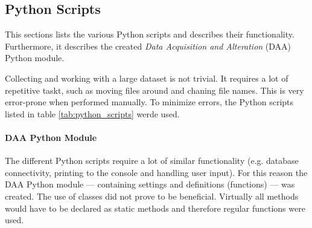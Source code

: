 \subsection{Python Scripts}
\label{subsec:python_scripts}

This sections lists the various Python scripts and describes their functionality.
Furthermore, it describes the created \textit{Data Acquisition and Alteration} (DAA) Python module.

Collecting and working with a large dataset is not trivial.
It requires a lot of repetitive taskt, such as moving files around and chaning file names.
This is very error-prone when performed manually.
To minimize errors, the Python scripts listed in table \ref{tab:python_scripts} werde used.
\\

\paragraph{DAA Python Module}
The different Python scripts require a lot of similar functionality (e.g. database connectivity, printing to the console and handling user input).
For this reason the DAA Python module --- containing settings and definitions (functions) --- was created.
The use of classes did not prove to be beneficial.
Virtually all methods would have to be declared as static methods and therefore regular functions were used.

